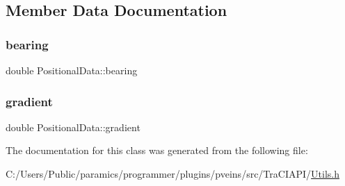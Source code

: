 \subsection{Member Data Documentation}
\mbox{\label{class_positional_data_a2ae5a622a025a392acfb29c66e6c310e}} 
\subsubsection{\texorpdfstring{bearing}{bearing}}
{\footnotesize\ttfamily double Positional\+Data\+::bearing}

\mbox{\label{class_positional_data_a2aa73f7333432a8b32d2036f4c940ff3}} 
\subsubsection{\texorpdfstring{gradient}{gradient}}
{\footnotesize\ttfamily double Positional\+Data\+::gradient}



The documentation for this class was generated from the following file\+:\begin{DoxyCompactItemize}
\item 
C\+:/\+Users/\+Public/paramics/programmer/plugins/pveins/src/\+Tra\+C\+I\+A\+P\+I/\hyperlink{_utils_8h}{Utils.\+h}\end{DoxyCompactItemize}
